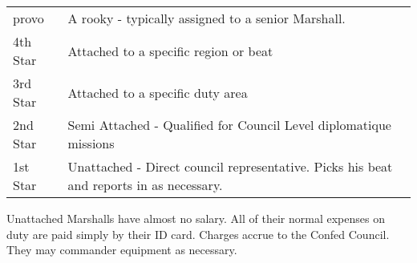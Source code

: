 \begin{tabular}{||l|l||}
provo	 & A rooky - typically assigned to a senior Marshall. \\
4th Star & Attached to a specific region or beat   \\
3rd Star & Attached to a specific duty area \\
2nd Star & Semi Attached - Qualified for Council Level diplomatique missions \\
1st Star & Unattached - Direct council representative. Picks his beat and reports in as necessary. \\
\end{tabular}

Unattached Marshalls have almost no salary. All of their normal 
expenses on duty are paid simply by their ID card. Charges accrue to 
the Confed  Council. They may commander equipment as necessary.


